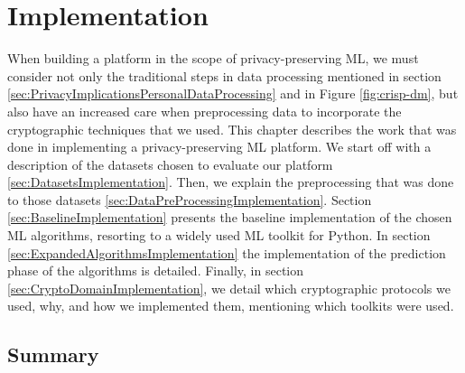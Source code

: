 %

\acresetall

\chapter{Implementation}
\label{ch:Implementation}

When building a platform in the scope of privacy-preserving \ac{ML}, we must consider not only the traditional steps in data processing mentioned in section \ref{sec:PrivacyImplicationsPersonalDataProcessing} and in Figure \ref{fig:crisp-dm}, but also have an increased care when preprocessing data to incorporate the cryptographic techniques that we used.
This chapter describes the work that was done in implementing a privacy-preserving \ac{ML} platform. We start off with a description of the datasets chosen to evaluate our platform \ref{sec:DatasetsImplementation}. Then, we explain the preprocessing that was done to those datasets \ref{sec:DataPreProcessingImplementation}.
Section \ref{sec:BaselineImplementation} presents the baseline implementation of the chosen \ac{ML} algorithms, resorting to a widely used \ac{ML} toolkit for Python.
In section \ref{sec:ExpandedAlgorithmsImplementation} the implementation of the prediction phase of the algorithms is detailed.
Finally, in section \ref{sec:CryptoDomainImplementation}, we detail which cryptographic protocols we used, why, and how we implemented them, mentioning which toolkits were used.










  
\section{Summary}
\label{sec:SummaryBARD}



